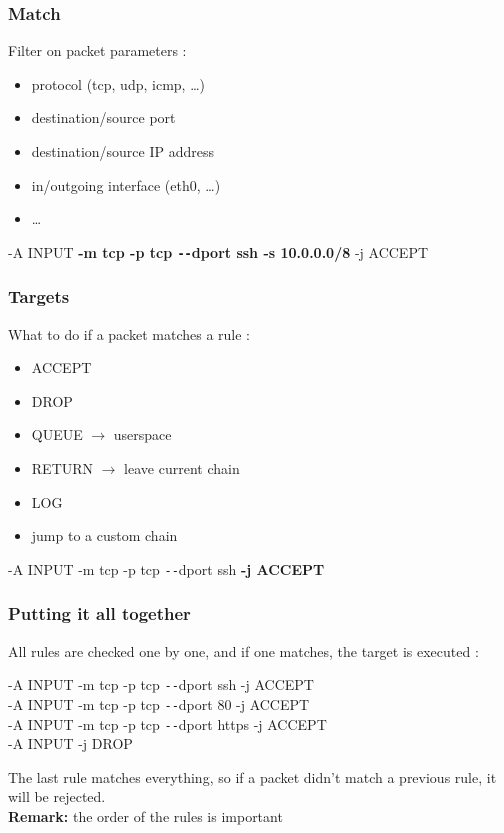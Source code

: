 \documentclass[14pt]{beamer}
\newcommand{\dd}{{\texttt{-{}-}}}
\begin{document}
  \begin{frame}
    \frametitle{Match}
    Filter on packet parameters :
    \begin{itemize}
      \item protocol (tcp, udp, icmp, \ldots)
      \item destination/source port
      \item destination/source IP address
      \item in/outgoing interface (eth0, \ldots)
      \item \ldots
    \end{itemize}
    \begin{example}
      \small{-A INPUT \textbf{-m tcp -p tcp \dd dport ssh -s 10.0.0.0/8} -j ACCEPT}
    \end{example}
  \end{frame}
  \begin{frame}
    \frametitle{Targets}
    What to do if a packet matches a rule :
    \begin{itemize}
      \item ACCEPT
      \item DROP
      \item QUEUE $\rightarrow$ userspace
      \item RETURN $\rightarrow$ leave current chain
      \item LOG
      \item jump to a custom chain
    \end{itemize}
    \begin{example}
      \small{-A INPUT -m tcp -p tcp \dd dport ssh \textbf{-j ACCEPT}}
    \end{example}
  \end{frame}
  \begin{frame}
    \frametitle{Putting it all together}
    All rules are checked one by one, and if one matches, the target is executed :
    \begin{example}
      \small{-A INPUT -m tcp -p tcp \dd dport ssh -j ACCEPT\\
      -A INPUT -m tcp -p tcp \dd dport 80 -j ACCEPT\\
      -A INPUT -m tcp -p tcp \dd dport https -j ACCEPT\\
      -A INPUT -j DROP}
    \end{example}
    The last rule matches everything, so if a packet didn't match a previous rule, it will be rejected.\\
    \pause
    \textbf{Remark:} the order of the rules is important
 \end{frame}
\end{document}
